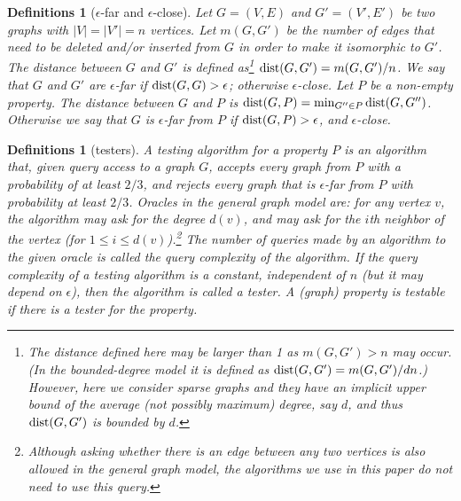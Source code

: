 \documentclass[11pt]{article}
\newtheorem{df}[thm]{Definitions}
\begin{document}
\begin{df}[$\epsilon$-far and $\epsilon$-close]
Let $G =(V, E)$ and $G' =(V', E')$ be two graphs 
with $|V| = |V'| =n$ vertices. 
Let $m(G,G')$ be the number of edges 
that need to be deleted and/or 
inserted from $G$ in order to make it isomorphic to $G'$. 
The distance between $G$ and $G'$ is defined as\footnote{
The distance defined here may be larger than 1 
as $m(G,G') > n$ may occur. 
(In the bounded-degree model 
it is defined as $\mbox{\rm dist}(G,G') = m(G,G')/dn$.) 
However, here we consider sparse graphs 
and they have an implicit upper bound of the average (not possibly maximum) degree, 
say $d$, and thus $\mbox{\rm dist}(G,G')$ is bounded by $d$. 
} 
$\mbox{\rm dist}(G,G') = m(G,G')/n$. 
We say that 
$G$ and $G'$ are {\em $\epsilon$-far} if 
$\mbox{\rm dist}(G,G) > \epsilon$; 
otherwise {\em $\epsilon$-close}. 
Let $P$ be a non-empty property. 
The distance between $G$ and $P$ is 
$\mbox{\rm dist}(G,P) = \min_{G'' \in P} \mbox{\rm dist}(G,G'')$. Otherwise we say that 
$G$ is {\em $\epsilon$-far} from $P$ if $\mbox{\rm dist}(G,P) > \epsilon$, 
and {\em $\epsilon$-close}. 
\end{df}



\begin{df}[testers]
A {\em testing algorithm} for a property $P$ is an algorithm that, given query access 
to a graph $G$, accepts every graph from $P$ 
with a probability of at least $2/3$, and rejects every graph that is $\epsilon$-far 
from $P$ with probability at least $2/3$. 
Oracles in the general graph model are: for any vertex $v$, the algorithm may ask for the degree $d(v)$, and may ask for the $i$th neighbor of the vertex (for $1 \leq i \leq d(v)$).\footnote{Although asking whether there is an edge between any two vertices is also allowed in the general graph model, the algorithms we use in this paper do not need to use this query.} 
The number of queries made by an algorithm to the given oracle is called 
the {\em query complexity} of the algorithm. 
If the query complexity of a testing algorithm is a constant, 
independent of $n$ (but it may depend on $\epsilon$), 
then the algorithm is called a {\em tester}. 
A (graph) property is {\em testable} if there is a tester for the property. 
\end{df}
\end{document}
